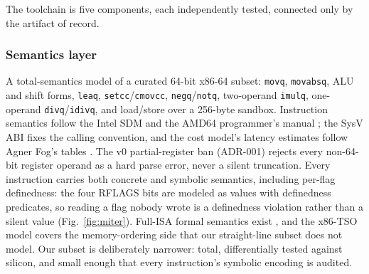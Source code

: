 \documentclass[journal,10pt]{IEEEtran}
\begin{document}
The toolchain is five components, each independently tested, connected
only by the artifact of record.

\subsubsection{Semantics layer} A total-semantics model of a curated
64-bit x86-64 subset: \texttt{movq}, \texttt{movabsq}, ALU and shift
forms, \texttt{leaq}, \texttt{setcc}/\texttt{cmovcc},
\texttt{negq}/\texttt{notq}, two-operand \texttt{imulq}, one-operand
\texttt{divq}/\texttt{idivq}, and load/store over a 256-byte sandbox.
Instruction semantics follow the Intel SDM \cite{intel-sdm} and the
AMD64 programmer's manual \cite{amd-apm}; the SysV ABI \cite{sysvabi}
fixes the calling convention, and the cost model's latency estimates
follow Agner Fog's tables \cite{fog-tables}. The v0 partial-register
ban (ADR-001) rejects every non-64-bit register operand as a hard
parse error, never a silent truncation. Every instruction carries both
concrete and symbolic semantics, including per-flag definedness: the
four RFLAGS bits are modeled as values with definedness predicates, so
reading a flag nobody wrote is a definedness violation rather than a
silent value (Fig.~\ref{fig:miter}). Full-ISA formal semantics exist
\cite{x86sem,x86isa17}, and the x86-TSO model \cite{x86tso10} covers
the memory-ordering side that our straight-line subset does not model.
Our subset is deliberately narrower: total, differentially tested
against silicon, and small enough that every instruction's symbolic
encoding is audited.
\end{document}
